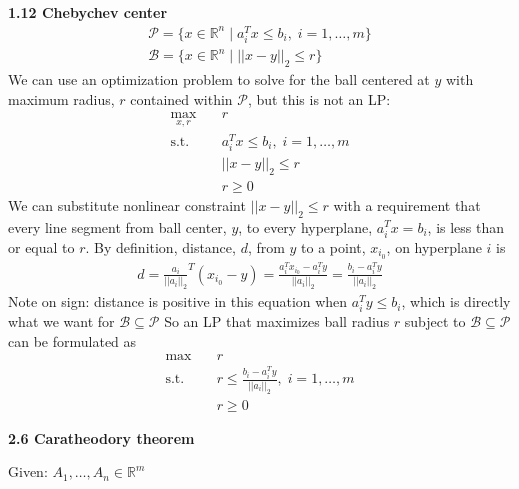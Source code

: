\documentclass[12pt]{exam}
\begin{document}
\begin{questions}
    \question \textbf{1.12 Chebychev center}
    \begin{align*}
        \mathcal{P} = \{x \in \mathbb{R}^n \mid a_i^Tx \leq b_i,\; i=1, \dots, m \} \tag{polyhedron}\\
        \mathcal{B} = \{x \in \mathbb{R}^n \mid ||x - y||_2 \leq r \} \tag{ball with center at $y$ and radius $r$}
    \end{align*}
    We can use an optimization problem to solve for the ball centered at $y$ with maximum radius, $r$ contained within $\mathcal{P}$, but this is not an LP:
    \begin{align*}
        \max_{x, r} \quad & r\\
        \text{s.t.}\quad & a_i^Tx \leq b_i,\; i=1, \dots, m\\\
        & ||x - y||_2 \leq r\\
        & r \geq 0
    \end{align*}
    We can substitute nonlinear constraint $||x - y||_2 \leq r$ with a requirement that every line segment from ball center, $y$, to every hyperplane, $a_i^Tx = b_i$, is less than or equal to $r$. By definition, distance, $d$, from $y$ to a point, $x_{i_0}$, on hyperplane $i$ is
    \begin{align*}
        d = \frac{a_i}{||a_i||_2}^T (x_{i_0} - y) = \frac{a_i^Tx_{i_0} - a_i^Ty}{||a_i||_2} = \frac{b_i - a_i^Ty}{||a_i||_2}
    \end{align*}
    Note on sign: distance is positive in this equation when $a_i^Ty \leq b_i$, which is directly what we want for $\mathcal{B} \subseteq \mathcal{P}$
    \newline So an LP that maximizes ball radius $r$ subject to $\mathcal{B} \subseteq \mathcal{P}$ can be formulated as
    \begin{align*}
        \max \quad & r\\
        \text{s.t.}\quad & r \leq \frac{b_i - a_i^Ty}{||a_i||_2},\; i=1, \dots, m\\
        & r \geq 0
    \end{align*}

    
    \question \textbf{2.6 Caratheodory theorem}
  
  Given: $A_1, \dots, A_n \in \mathbb{R}^m$
  \begin{parts}
    \part 
    let $\mathcal{C} = \{\sum_i^n \lambda_i A_i \mid \lambda_i \geq 0 \}$ and $A=[A_1, \dots, A_n]$
    

\end{parts}
\end{questions}
\end{document}
